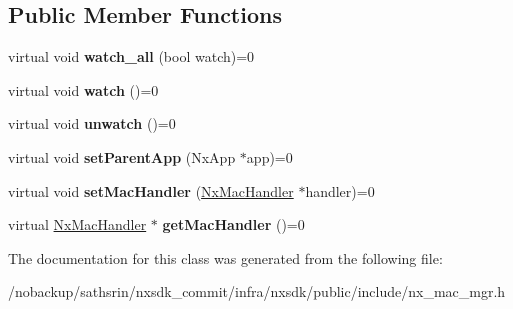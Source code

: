 \subsection*{Public Member Functions}
\begin{DoxyCompactItemize}
\item 
\hypertarget{classnxos_1_1NxMacMgr_a373a182d411020a4daf23b1893f38800}{virtual void {\bfseries watch\-\_\-all} (bool watch)=0}\label{classnxos_1_1NxMacMgr_a373a182d411020a4daf23b1893f38800}

\item 
\hypertarget{classnxos_1_1NxMacMgr_a34aa11b0d51964f0f1ddce5111886a1b}{virtual void {\bfseries watch} ()=0}\label{classnxos_1_1NxMacMgr_a34aa11b0d51964f0f1ddce5111886a1b}

\item 
\hypertarget{classnxos_1_1NxMacMgr_ad45bbf2ee57f9baf1505184085b41fc8}{virtual void {\bfseries unwatch} ()=0}\label{classnxos_1_1NxMacMgr_ad45bbf2ee57f9baf1505184085b41fc8}

\item 
\hypertarget{classnxos_1_1NxMacMgr_af5f38b44949d138a2b7b52f875b6d79c}{virtual void {\bfseries set\-Parent\-App} (Nx\-App $\ast$app)=0}\label{classnxos_1_1NxMacMgr_af5f38b44949d138a2b7b52f875b6d79c}

\item 
\hypertarget{classnxos_1_1NxMacMgr_a59c4250cbe663d8823146d49c3e471c5}{virtual void {\bfseries set\-Mac\-Handler} (\hyperlink{classnxos_1_1NxMacHandler}{Nx\-Mac\-Handler} $\ast$handler)=0}\label{classnxos_1_1NxMacMgr_a59c4250cbe663d8823146d49c3e471c5}

\item 
\hypertarget{classnxos_1_1NxMacMgr_a8c1742fe5aca657457fd3a02f80cf054}{virtual \hyperlink{classnxos_1_1NxMacHandler}{Nx\-Mac\-Handler} $\ast$ {\bfseries get\-Mac\-Handler} ()=0}\label{classnxos_1_1NxMacMgr_a8c1742fe5aca657457fd3a02f80cf054}

\end{DoxyCompactItemize}


The documentation for this class was generated from the following file\-:\begin{DoxyCompactItemize}
\item 
/nobackup/sathsrin/nxsdk\-\_\-commit/infra/nxsdk/public/include/nx\-\_\-mac\-\_\-mgr.\-h\end{DoxyCompactItemize}

